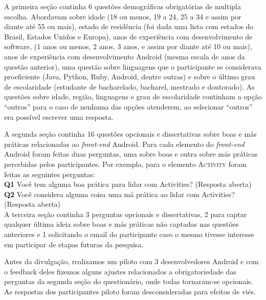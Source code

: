 
A primeira seção continha 6 questões demográficas obrigatórias de multipla escolha. Abordavam sobre idade (18 ou menos, 19 a 24, 25 a 34 e assim por diante até 55 ou mais), estado de residência (foi dada uma lista com estados do Brasil, Estados Unidos e Europa), anos de experiência com desenvolvimento de software, (1 anos ou menos, 2 anos, 3 anos, e assim por diante até 10 ou mais), anos de experiência com desenvolvimento Android (mesma escala de anos da questão anterior), uma questão sobre linguagens que o participante se considerava proeficiente (Java, Python, Ruby, Android, dentre outras) e sobre o último grau de escolaridade (estudante de bacharelado, bacharel, mestrado e doutorado). As questões sobre idade, região, linguagens e grau de escolaridade continham a opção ``outros'' para o caso de nenhuma das opções atenderem, ao selecionar ``outros'' era possível escrever uma resposta.

A segunda seção continha 16 questões opcionais e dissertativas sobre boas e más práticas relacionadas ao \textit{front-end} Android. Para cada elemento do \textit{front-end} Android foram feitas duas perguntas, uma sobre boas e outra sobre más práticas percebidas pelos participantes. Por exemplo, para o elemento \textsc{Activity} foram feitas as seguintes perguntas: \\

\noindent
\textbf{Q1} Você tem alguma boa prática para lidar com Activities? (Resposta aberta) \\

\noindent
\textbf{Q2} Você considera alguma coisa uma má prática ao lidar com Activities? (Resposta aberta) \\

A terceira seção continha 3 perguntas opcionais e dissertativas, 2 para captar qualquer última ideia sobre boas e más práticas não captadas nas questões anteriores e 1 solicitando o email do participante caso o mesmo tivesse interesse em participar de etapas futuras da pesquisa. 

Antes da divulgação, realizamos um piloto com 3 desenvolvedores Android e com o feedback deles fizemos alguns ajustes relacionados a obrigatoriedade das perguntas da segunda seção do questionário, onde todas tornaram-se opcionais. As respostas dos participantes piloto foram desconsideradas para efeitos de viés. 


